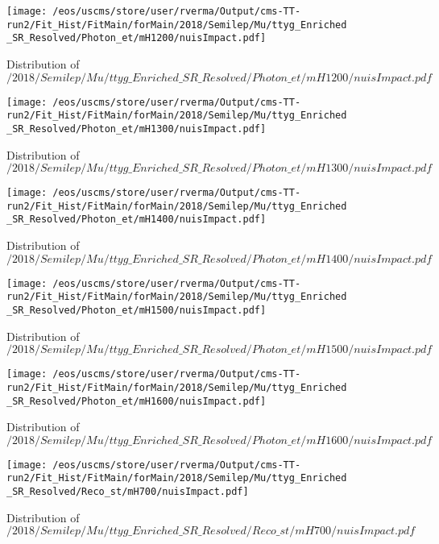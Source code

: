 \begin{figure}
\centering
\texttt{[image: /eos/uscms/store/user/rverma/Output/cms-TT-run2/Fit\_Hist/FitMain/forMain/2018/Semilep/Mu/ttyg\_Enriched\_SR\_Resolved/Photon\_et/mH1200/nuisImpact.pdf]}
\caption{Distribution of $/2018/Semilep/Mu/ttyg\_Enriched\_SR\_Resolved/Photon\_et/mH1200/nuisImpact.pdf$}
\end{figure}

\begin{figure}
\centering
\texttt{[image: /eos/uscms/store/user/rverma/Output/cms-TT-run2/Fit\_Hist/FitMain/forMain/2018/Semilep/Mu/ttyg\_Enriched\_SR\_Resolved/Photon\_et/mH1300/nuisImpact.pdf]}
\caption{Distribution of $/2018/Semilep/Mu/ttyg\_Enriched\_SR\_Resolved/Photon\_et/mH1300/nuisImpact.pdf$}
\end{figure}

\begin{figure}
\centering
\texttt{[image: /eos/uscms/store/user/rverma/Output/cms-TT-run2/Fit\_Hist/FitMain/forMain/2018/Semilep/Mu/ttyg\_Enriched\_SR\_Resolved/Photon\_et/mH1400/nuisImpact.pdf]}
\caption{Distribution of $/2018/Semilep/Mu/ttyg\_Enriched\_SR\_Resolved/Photon\_et/mH1400/nuisImpact.pdf$}
\end{figure}

\begin{figure}
\centering
\texttt{[image: /eos/uscms/store/user/rverma/Output/cms-TT-run2/Fit\_Hist/FitMain/forMain/2018/Semilep/Mu/ttyg\_Enriched\_SR\_Resolved/Photon\_et/mH1500/nuisImpact.pdf]}
\caption{Distribution of $/2018/Semilep/Mu/ttyg\_Enriched\_SR\_Resolved/Photon\_et/mH1500/nuisImpact.pdf$}
\end{figure}

\begin{figure}
\centering
\texttt{[image: /eos/uscms/store/user/rverma/Output/cms-TT-run2/Fit\_Hist/FitMain/forMain/2018/Semilep/Mu/ttyg\_Enriched\_SR\_Resolved/Photon\_et/mH1600/nuisImpact.pdf]}
\caption{Distribution of $/2018/Semilep/Mu/ttyg\_Enriched\_SR\_Resolved/Photon\_et/mH1600/nuisImpact.pdf$}
\end{figure}

\begin{figure}
\centering
\texttt{[image: /eos/uscms/store/user/rverma/Output/cms-TT-run2/Fit\_Hist/FitMain/forMain/2018/Semilep/Mu/ttyg\_Enriched\_SR\_Resolved/Reco\_st/mH700/nuisImpact.pdf]}
\caption{Distribution of $/2018/Semilep/Mu/ttyg\_Enriched\_SR\_Resolved/Reco\_st/mH700/nuisImpact.pdf$}
\end{figure}

